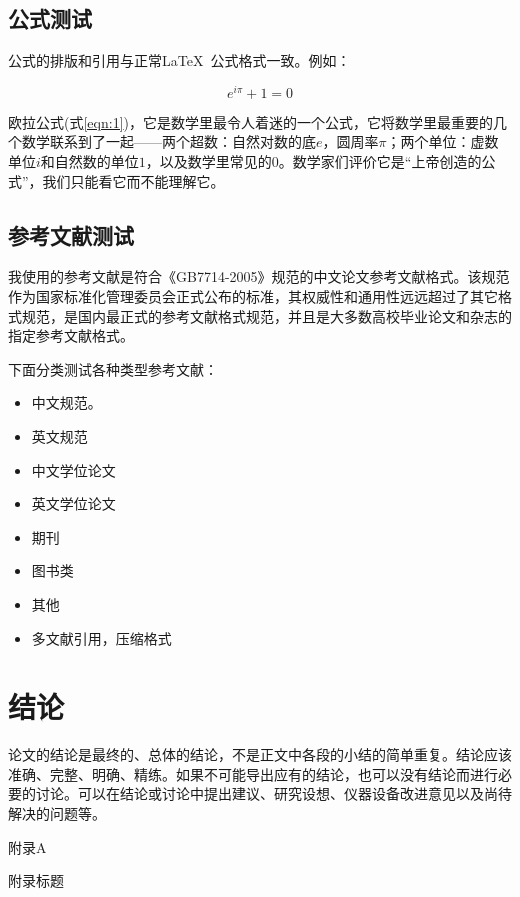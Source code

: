 \documentclass{bjtuthesis}
\begin{document}
\section{公式测试}
公式的排版和引用与正常\LaTeX\ 公式格式一致。例如：

\begin{equation}
    \label{eqn:1}
    e^{i\pi}+1=0
\end{equation}

欧拉公式(式\ref{eqn:1})，它是数学里最令人着迷的一个公式，它将数学里最重要的几个数学联系到了一起——两个超数：自然对数的底$e$，圆周率$\pi$；两个单位：虚数单位$i$和自然数的单位$1$，以及数学里常见的$0$。数学家们评价它是“上帝创造的公式”，我们只能看它而不能理解它。

\section{参考文献测试}
我使用的参考文献是符合《GB7714-2005》规范的中文论文参考文献格式。该规范作为国家标准化管理委员会正式公布的标准，其权威性和通用性远远超过了其它格式规范，是国内最正式的参考文献格式规范，并且是大多数高校毕业论文和杂志的指定参考文献格式。

下面分类测试各种类型参考文献：

\begin{itemize}
    \item 中文规范\citep{C1}。
    \item 英文规范\citep{ACI318}
    \item 中文学位论文\citep{liguiqian}
    \item 英文学位论文\citep{bentz2000}
    \item 期刊\citep{FMK}
    \item 图书类\citep{B1}
    \item 其他\citep{R1}
    \item 多文献引用，压缩格式\citep{C1,ACI318,liguiqian,R1}
\end{itemize}

\chapter{结论}
论文的结论是最终的、总体的结论，不是正文中各段的小结的简单重复。结论应该准确、完整、明确、精练。如果不可能导出应有的结论，也可以没有结论而进行必要的讨论。可以在结论或讨论中提出建议、研究设想、仪器设备改进意见以及尚待解决的问题等。

\cleardoublepage
\begin{center}
    {\heiti 附录A}
\end{center}
\begin{center}
    {\heiti 附录标题}
\end{center}
\end{document}

